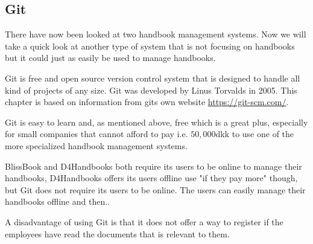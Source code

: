 \subsection{Git}
There have now been looked at two handbook management systems. Now we will take a quick look at another type of system that is not focusing on handbooks but it could just as easily be used to manage handbooks.

Git is free and open source version control system that is designed to handle all kind of projects of any size. Git was developed by Linus Torvalds in 2005. This chapter is based on information from gits own website \url{https://git-scm.com/}.

Git is easy to learn and, as mentioned above, free which is a great plus, especially for small companies that cannot afford to pay i.e. $50,000$dkk to use one of the more specialized handbook management systems.

BlissBook and D4Handbooks both require its users to be online to manage their handbooks, D4Handbooks offers its users offline use "if they pay more" though, but Git does not require its users to be online. The users can easily manage their handbooks offline and then.. %

A disadvantage of using Git is that it does not offer a way to register if the employees have read the documents that is relevant to them.
